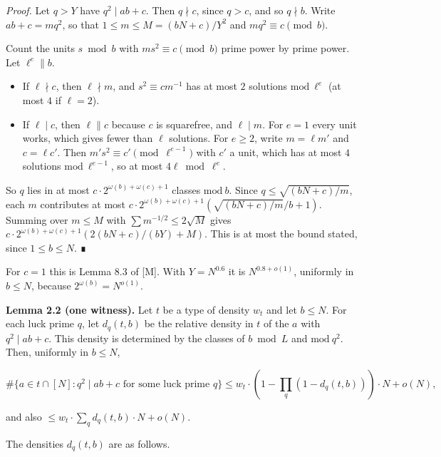 \documentclass[
  11pt,
]{article}
\providecommand{\tightlist}{%
  \setlength{\itemsep}{0pt}\setlength{\parskip}{0pt}}
\begin{document}
\emph{Proof.} Let \(q > Y\) have \(q^2 \mid ab + c\). Then
\(q \nmid c\), since \(q > c\), and so \(q \nmid b\). Write
\(ab + c = mq^2\), so that \(1 \le m \le M = (bN + c)/Y^2\) and
\(mq^2 \equiv c \pmod{b}\).

Count the units \(s \bmod b\) with \(ms^2 \equiv c \pmod{b}\) prime
power by prime power. Let \(\ell^e \parallel b\).

\begin{itemize}
\tightlist
\item
  If \(\ell \nmid c\), then \(\ell \nmid m\), and \(s^2 \equiv cm^{-1}\)
  has at most \(2\) solutions \(\mathrm{mod}\ \ell^e\) (at most \(4\) if
  \(\ell = 2\)).
\item
  If \(\ell \mid c\), then \(\ell \parallel c\) because \(c\) is
  squarefree, and \(\ell \mid m\). For \(e = 1\) every unit works, which
  gives fewer than \(\ell\) solutions. For \(e \ge 2\), write
  \(m = \ell m'\) and \(c = \ell c'\). Then
  \(m's^2 \equiv c' \pmod{\ell^{e-1}}\) with \(c'\) a unit, which has at
  most \(4\) solutions \(\mathrm{mod}\ \ell^{e-1}\), so at most
  \(4\ell \bmod \ell^e\).
\end{itemize}

So \(q\) lies in at most \(c\cdot 2^{\omega(b)+\omega(c)+1}\) classes
\(\mathrm{mod}\ b\). Since \(q \le \sqrt{(bN + c)/m}\), each \(m\)
contributes at most
\(c\cdot 2^{\omega(b)+\omega(c)+1}\left(\sqrt{(bN + c)/m}/b + 1\right)\).
Summing over \(m \le M\) with \(\sum m^{-1/2} \le 2\sqrt{M}\) gives
\(c\cdot 2^{\omega(b)+\omega(c)+1}\left(2(bN + c)/(bY) + M\right)\).
This is at most the bound stated, since \(1 \le b \le N\). ∎

For \(c = 1\) this is Lemma 8.3 of {[}M{]}. With \(Y = N^{0.6}\) it is
\(N^{0.8+o(1)}\), uniformly in \(b \le N\), because
\(2^{\omega(b)} = N^{o(1)}\).

\textbf{Lemma 2.2 (one witness).} Let \(t\) be a type of density \(w_t\)
and let \(b \le N\). For each luck prime \(q\), let \(d_q(t, b)\) be the
relative density in \(t\) of the \(a\) with \(q^2 \mid ab + c\). This
density is determined by the classes of \(b \bmod L\) and
\(\mathrm{mod}\ q^2\). Then, uniformly in \(b \le N\),

\[\#\{a \in t \cap [N] : q^2 \mid ab + c \text{ for some luck prime } q\} \le w_t\cdot\left(1 - \prod_q (1 - d_q(t, b))\right)\cdot N + o(N),\]

and also \(\le w_t\cdot\sum_q d_q(t, b)\cdot N + o(N)\).

The densities \(d_q(t, b)\) are as follows.
\end{document}
